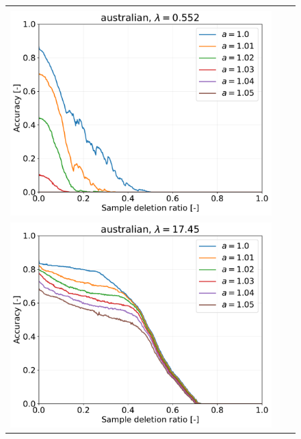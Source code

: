 \begin{figure}[H]
	\begin{tabular}{ccc}
		\begin{minipage}[b]{0.3\hsize}\centering {\small Dataset: australian, $\lambda=n \cdot 10^{-3}$}\\\includegraphics[width=0.8\hsize]{fig/table_logistic/australian-logistic/kernel/kernel_ss_screening_rate_lam0.552_x_n_y_etest.pdf}\end{minipage}
		&
		\begin{minipage}[b]{0.3\hsize}\centering {\small Dataset: australian, $\lambda=n \cdot 10^{-1.5}$}\\\includegraphics[width=0.8\hsize]{fig/table_logistic/australian-logistic/kernel/kernel_ss_screening_rate_lam17.45_x_n_y_etest.pdf}\end{minipage}
		&

\end{tabular}
\end{figure}
